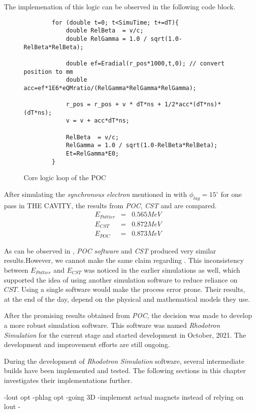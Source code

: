 \documentclass{article}
\begin{document}
The implemenation of this logic can be observed in the following code block.
\begin{figure}[H]
    \begin{verbatim}
        for (double t=0; t<SimuTime; t+=dT){
            double RelBeta  = v/c;
            double RelGamma = 1.0 / sqrt(1.0-RelBeta*RelBeta);
        
            double ef=Eradial(r_pos*1000,t,0); // convert position to mm
            double acc=ef*1E6*eQMratio/(RelGamma*RelGamma*RelGamma); 
        
            r_pos = r_pos + v * dT*ns + 1/2*acc*(dT*ns)*(dT*ns);
            v = v + acc*dT*ns;

            RelBeta  = v/c;
            RelGamma = 1.0 / sqrt(1.0-RelBeta*RelBeta);
            Et=RelGamma*E0; 
        }
    \end{verbatim}
    \caption{Core logic loop of the POC}
    \label{fig:POC_core_logic}
\end{figure}

After simulating the \textit{synchronous electron} mentioned in  with $\phi_{lag}=15^\circ$ for one pass in THE CAVITY, the results from \textit{POC}, \textit{CST} and  are compared.
\begin{eqnarray}
    E_{Pottier} &=& 0.565 MeV \nonumber\\
    E_{CST} &=& 0.872 MeV \label{eq:poc_E_results}\\
    E_{POC} &=& 0.873 MeV \nonumber
\end{eqnarray}

As can be observed in , \textit{POC software} and \textit{CST} produced very similar results.However, we cannot make the same claim regarding .
This inconsistency between $E_{Pottier}$ and $E_{CST}$ was noticed in the earlier simulations as well, which supported the idea of using another simulation software to reduce reliance on $CST$.
Using a single software would make the process error prone. Their results, at the end of the day, depend on the physical and mathematical models they use.

After the promising results obtained from \textit{POC}, the decision was made to develop a more robust simulation software. This software was named \textit{Rhodotron Simulation} for the current stage and started development in October, 2021.
The development and improvement efforts are still ongoing. 

During the development of \textit{Rhodotron Simulation} software, several intermediate builds have been implemented and tested. The following sections in this chapter investigates their implementations further.



-lout opt
-phlag opt
-going 3D
-implement actual magnets instead of relying on lout
-
\end{document}
